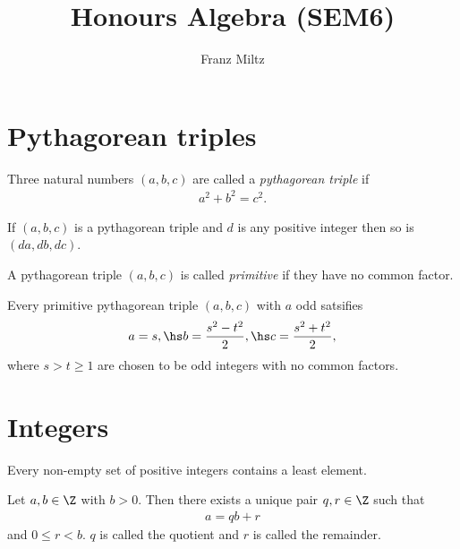 \documentclass{article}
\begin{document}
\mkthmstwounified
\title{Honours Algebra (SEM6)}
\author{Franz Miltz}
\maketitle
\tableofcontents
\pagebreak

\section{Pythagorean triples}

\begin{definition}
    Three natural numbers $(a,b,c)$ are called a \emph{pythagorean triple} if 
    \begin{align*}
        a^2 + b^2 = c^2.
    \end{align*}
\end{definition}

\begin{lemma}
    If $(a,b,c)$ is a pythagorean triple and $d$ is any positive integer then 
    so is $(da,db,dc)$.
\end{lemma}

\begin{definition}
    A pythagorean triple $(a,b,c)$ is called \emph{primitive} if they have no common factor.
\end{definition}

\begin{theorem}
    Every primitive pythagorean triple $(a,b,c)$ with $a$ odd satsifies 
    \begin{align*}
        a=s,\hs b=\frac{s^2-t^2}{2},\hs c=\frac{s^2+t^2}{2},
    \end{align*}
    where $s>t\geq 1$ are chosen to be odd integers with no common factors.
\end{theorem}

\section{Integers}

\begin{theorem}
    Every non-empty set of positive integers contains a least element.
\end{theorem}

\begin{theorem}
    Let $a,b\in\Z$ with $b>0$. Then there exists a unique pair $q,r\in\Z$ such that 
    \begin{align*}
        a = qb + r
    \end{align*} 
    and $0\leq r<b$. $q$ is called the quotient and $r$ is called the remainder.
\end{theorem}
\end{document}
